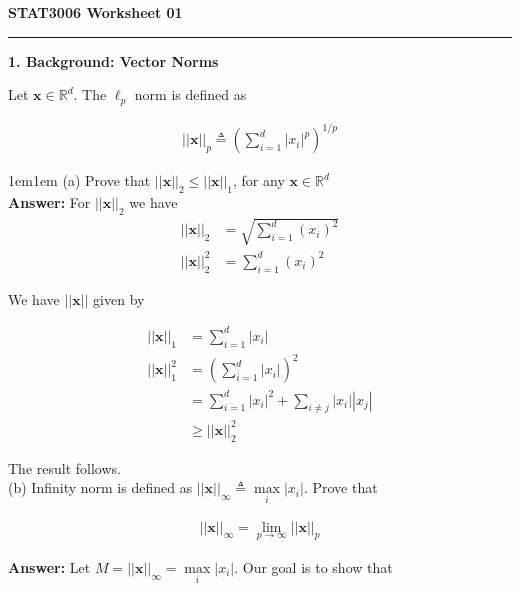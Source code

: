 \documentclass[11pt]{article}
\begin{document}
    \begin{center}
        \LARGE \textbf{STAT3006 Worksheet 01}
    \end{center}

    \rule{\textwidth}{0.3pt}

    \large \textbf{1. Background: Vector Norms}

    Let $\mathbf{x} \in \mathbb{R}^d$. The $\ell_p$ norm is defined as 

    \begin{align*}
        ||\mathbf{x}||_p \triangleq \left(\sum_{i = 1}^d |x_i|^p\right)^{1/p}
    \end{align*}

    \begin{adjustwidth}{1em}{1em}
    (a) Prove that $||\mathbf{x}||_2 \leq ||\mathbf{x}||_1$, for any $\mathbf{x} \in \mathbb{R}^d$
    \\ 

    \textbf{Answer:} For $||\mathbf{x}||_2$ we have \\ 

    \begin{align*}
        ||\mathbf{x}||_2 &= \sqrt{\sum_{i = 1}^d (x_i)^2} \\ 
        ||\mathbf{x}||_2^2 &= \sum_{i = 1}^d (x_i)^2
    \end{align*}

    We have $||\mathbf{x}||$ given by 

    \begin{align*}
        ||\mathbf{x}||_1 &= \sum_{i = 1}^d |x_i| \\ 
        ||\mathbf{x}||_1^2 &= \left(\sum_{i = 1}^d |x_i| \right)^2 \\
                           &= \sum_{i = 1}^d |x_i|^2 + \sum_{i \neq j} |x_i| |x_j| \\ 
                           &\geq ||\mathbf{x}||_2^2
    \end{align*}

    The result follows. \\ 

    (b) Infinity norm is defined as $||\mathbf{x}||_\infty \triangleq \max\limits_{i} |x_i|$. Prove
    that 

    \begin{align*}
        ||\mathbf{x}||_\infty = \lim_{p\to\infty}||\mathbf{x}||_p
    \end{align*}

    \textbf{Answer:} Let $M = ||\mathbf{x}||_\infty = \max\limits_{i}|x_i|$. Our goal is to show 
    that 


\end{adjustwidth}
\end{document}
